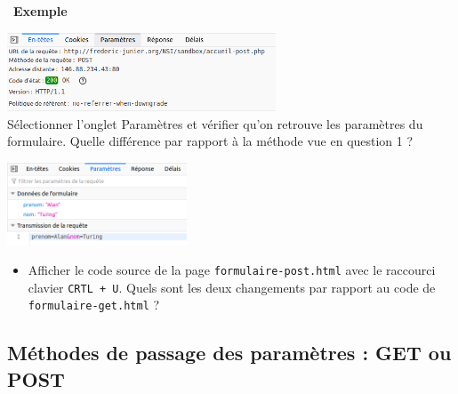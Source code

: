 \documentclass[
  11pt,
]{article}
\newcommand{\passthrough}[1]{#1}
\providecommand{\tightlist}{%
  \setlength{\itemsep}{0pt}\setlength{\parskip}{0pt}}
\newcounter{exple}
\newenvironment{exemple}[1]
{\par \medskip   \addtocounter{exple}{1} \noindent  
\begin{bclogo}[arrondi =0.1,   noborder = true, logo=\bclampe, marge=4]{~\textbf{Exemple} \textbf{\theexple} {\itshape #1} }  \par}
{
\end{bclogo}
 \par \bigskip }
\begin{document}
\begin{exemple}{}
\begin{enumerate}
  \includegraphics[width=0.6\textwidth,height=\textheight]{images/entete-post.png}\\

  Sélectionner l'onglet Paramètres et vérifier qu'on retrouve les
  paramètres du formulaire. Quelle différence par rapport à la méthode
  vue en question 1 ?

  \includegraphics[width=0.4\textwidth,height=\textheight]{images/parametres2.png}\\

  \begin{itemize}
  \tightlist
  \item
    Afficher le code source de la page
    \passthrough{\lstinline!formulaire-post.html!} avec le raccourci
    clavier \passthrough{\lstinline!CRTL + U!}. Quels sont les deux
    changements par rapport au code de
    \passthrough{\lstinline!formulaire-get.html!} ?
  \end{itemize}
\end{enumerate}

\end{exemple}

\hypertarget{muxe9thodes-de-passage-des-paramuxe8tres-get-ou-post}{%
\subsection{Méthodes de passage des paramètres : GET ou
POST}\label{muxe9thodes-de-passage-des-paramuxe8tres-get-ou-post}}
\end{document}
